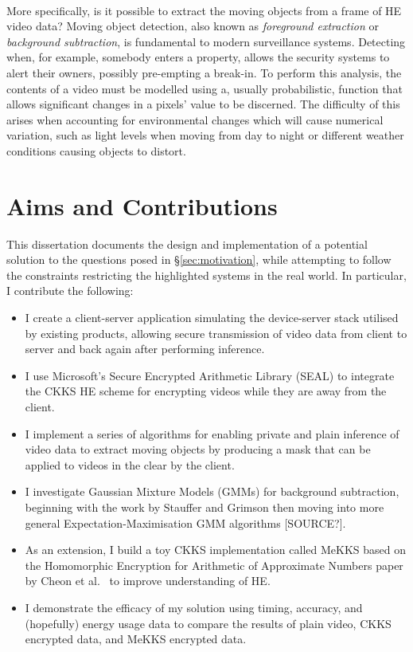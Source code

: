 \smallskip \\ \indent
More specifically, is it possible to extract the moving objects from a frame of HE video data? Moving object detection, also known as \textit{foreground extraction} or \textit{background subtraction}, is fundamental to modern surveillance systems. Detecting when, for example, somebody enters a property, allows the security systems to alert their owners, possibly pre-empting a break-in. To perform this analysis, the contents of a video must be modelled using a, usually probabilistic, function that allows significant changes in a pixels' value to be discerned. The difficulty of this arises when accounting for environmental changes which will cause numerical variation, such as light levels when moving from day to night or different weather conditions causing objects to distort.

\setlength{\leftskip}{0cm}

\section{Aims and Contributions}
\label{sec:aimsAndContributions}
\setlength{\leftskip}{0.5cm}
\indent \indent
This dissertation documents the design and implementation of a potential solution to the questions posed in §\ref{sec:motivation}, while attempting to follow the constraints restricting the highlighted systems in the real world. In particular, I contribute the following:
\begin{itemize}
    \item I create a client-server application simulating the device-server stack utilised by existing products, allowing secure transmission of video data from client to server and back again after performing inference.
    \item I use Microsoft's Secure Encrypted Arithmetic Library (SEAL) \cite{SEAL} to integrate the CKKS HE scheme \cite{CKKS} for encrypting videos while they are away from the client.
    \item I implement a series of algorithms for enabling private and plain inference of video data to extract moving objects by producing a mask that can be applied to videos in the clear by the client.
    \item I investigate Gaussian Mixture Models (GMMs) for background subtraction, beginning with the work by Stauffer and Grimson \cite{Stauffer} then moving into more general Expectation-Maximisation GMM algorithms [SOURCE?].
    \item As an extension, I build a toy CKKS implementation called MeKKS based on the Homomorphic Encryption for Arithmetic of Approximate Numbers paper by Cheon et al.\ \cite{CKKS,BootstrappingHEAAN} to improve understanding of HE.
    \item I demonstrate the efficacy of my solution using timing, accuracy, and (hopefully) energy usage data to compare the results of plain video, CKKS encrypted data, and MeKKS encrypted data.
\end{itemize}

